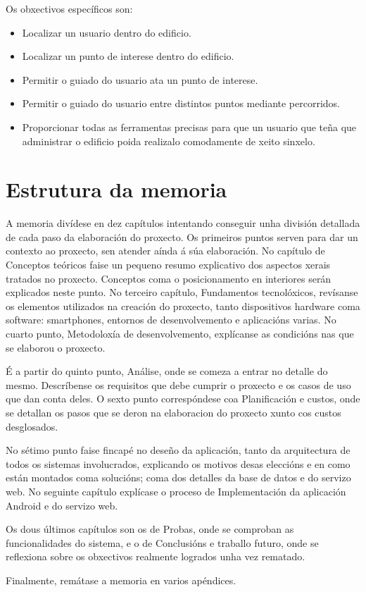 Os obxectivos específicos son:
\begin{itemize}
	\item Localizar un usuario dentro do edificio.
	\item Localizar un punto de interese dentro do edificio.
	\item Permitir o guiado do usuario ata un punto de interese.
	\item Permitir o guiado do usuario entre distintos puntos mediante percorridos.
	\item Proporcionar todas as ferramentas precisas para que un usuario que teña que administrar o edificio poida realizalo comodamente de xeito sinxelo.
\end{itemize}

\section{Estrutura da memoria}

A memoria divídese en dez capítulos intentando conseguir unha división detallada de cada paso da elaboración do proxecto. Os primeiros puntos serven para dar un contexto ao proxecto, sen atender aínda á súa elaboración. No capítulo de Conceptos teóricos faise un pequeno resumo explicativo dos aspectos xerais tratados no proxecto. Conceptos coma o posicionamento en interiores serán explicados neste punto. No terceiro capítulo, Fundamentos tecnolóxicos, revísanse os elementos utilizados na creación do proxecto, tanto dispositivos hardware coma software: smartphones, entornos de desenvolvemento e aplicacións varias. No cuarto punto, Metodoloxía de desenvolvemento, explícanse as condicións nas que se elaborou o proxecto.

É a partir do quinto punto, Análise, onde se comeza a entrar no detalle do mesmo. Descríbense os requisitos que debe cumprir o proxecto e os casos de uso que dan conta deles. O sexto punto correspóndese coa Planificación e custos, onde se detallan os pasos que se deron na elaboracion do proxecto xunto cos custos desglosados.

No sétimo punto faise fincapé no deseño da aplicación, tanto da arquitectura de todos os sistemas involucrados, explicando os motivos desas eleccións e en como están montados coma solucións; coma dos detalles da base de datos e do servizo web.
No seguinte capítulo explícase o proceso de Implementación da aplicación Android e do servizo web.

Os dous últimos capítulos son os de Probas, onde se comproban as funcionalidades do sistema, e o de Conclusións e traballo futuro, onde se reflexiona sobre os obxectivos realmente logrados unha vez rematado.

Finalmente, remátase a memoria en varios apéndices.
